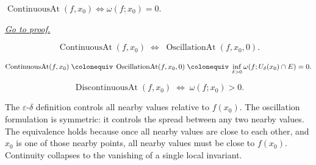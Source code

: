 
\begin{theorem}
\label{thm:continuity-iff-zero-oscillation}
$\operatorname{ContinuousAt}(f,x_0)\iff\omega(f;x_0)=0$.

\smallskip\noindent
\hyperref[prf:continuity-iff-zero-oscillation]{\textit{Go to proof.}}
\end{theorem}

\begin{remark*}
\[
  \operatorname{ContinuousAt}(f,x_0)
  \;\iff\;
  \operatorname{OscillationAt}(f,x_0,0).
\]
\end{remark*}

\begin{remark*}
\[
  \operatorname{ContinuousAt}(f,x_0)
  \;\colonequiv\;
  \operatorname{OscillationAt}(f,x_0,0)
  \;\colonequiv\;
  \inf_{\delta>0}\omega(f;U_\delta(x_0)\cap E)=0.
\]
\end{remark*}

\begin{remark*}
\[
  \operatorname{DiscontinuousAt}(f,x_0)
  \;\iff\;
  \omega(f;x_0)>0.
\]
\end{remark*}

\begin{remark*}[Interpretation]
The $\varepsilon$-$\delta$ definition controls all nearby values
relative to $f(x_0)$. The oscillation formulation is symmetric:
it controls the spread between any two nearby values. The equivalence
holds because once all nearby values are close to each other, and
$x_0$ is one of those nearby points, all nearby values must be close
to $f(x_0)$. Continuity collapses to the vanishing of a single
local invariant.
\end{remark*}


